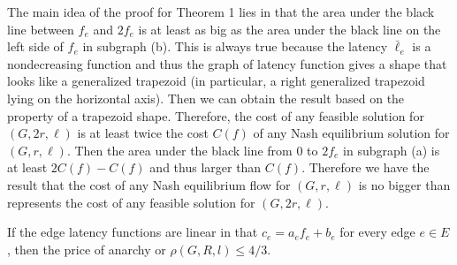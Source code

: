 \begin{proof-sketch}
    The main idea of the proof for Theorem 1 lies in that the area under the black line between $f_e$ and $2f_e$ is at least as big as the area under the black line on the left side of $f_e$ in subgraph (b). This is always true because the latency $\bar{\ell}_e$ is a nondecreasing function and thus the graph of latency function gives a shape that looks like a generalized trapezoid (in particular, a right generalized trapezoid lying on the horizontal axis). Then we can obtain the result based on the property of a trapezoid shape. Therefore, the cost of any feasible solution for $(G, 2r, \ell)$ is at least twice the cost $C(f)$ of any Nash equilibrium solution for $(G, r, \ell)$. Then the area under the black line from $0$ to $2f_e$ in subgraph (a) is at least $2C(f)-C(f)$ and thus larger than $C(f)$. Therefore we have the result that the cost of any Nash equilibrium flow for $(G, r, \ell)$ is no bigger than represents the cost of any feasible solution for $(G, 2r, \ell)$.
    
\end{proof-sketch}

\begin{theorem}
    If the edge latency functions are linear in that $c_e = a_ef_e + b_e$ for every edge $e \in E$, then the price of anarchy or $\rho(G, R,l) \leq 4/3$.
\end{theorem}

